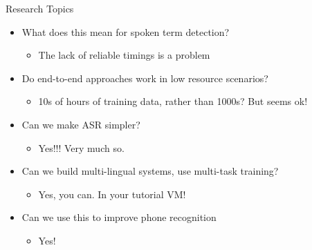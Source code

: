 \begin{frame}{Research Topics}
  \begin{itemize}
  \item What does this mean for spoken term detection?
    \begin{itemize}
    \item The lack of reliable timings is a problem
    \end{itemize}
  \item Do end-to-end approaches work in low resource scenarios?
    \begin{itemize}
    \item 10s of hours of training data, rather than 1000s? But seems ok!
    \end{itemize}
  \item Can we make ASR simpler?
    \begin{itemize}
    \item Yes!!! Very much so.
    \end{itemize}
  \item Can we build multi-lingual systems, use multi-task training?
    \begin{itemize}
    \item Yes, you can. In your tutorial VM!
    \end{itemize}
  \item Can we use this to improve phone recognition
    \begin{itemize}
    \item Yes!
    \end{itemize}
  \end{itemize}
\end{frame}

